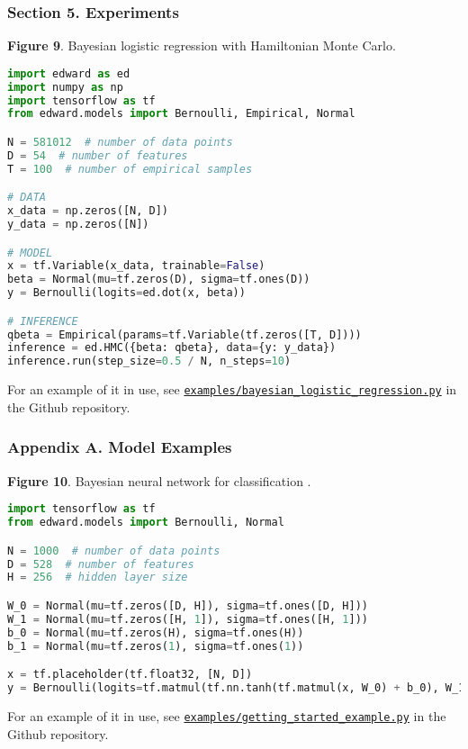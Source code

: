 \subsubsection{Section 5. Experiments}

\textbf{Figure 9}. Bayesian logistic regression with Hamiltonian Monte Carlo.
\begin{lstlisting}[language=python]
import edward as ed
import numpy as np
import tensorflow as tf
from edward.models import Bernoulli, Empirical, Normal

N = 581012  # number of data points
D = 54  # number of features
T = 100  # number of empirical samples

# DATA
x_data = np.zeros([N, D])
y_data = np.zeros([N])

# MODEL
x = tf.Variable(x_data, trainable=False)
beta = Normal(mu=tf.zeros(D), sigma=tf.ones(D))
y = Bernoulli(logits=ed.dot(x, beta))

# INFERENCE
qbeta = Empirical(params=tf.Variable(tf.zeros([T, D])))
inference = ed.HMC({beta: qbeta}, data={y: y_data})
inference.run(step_size=0.5 / N, n_steps=10)
\end{lstlisting}
For an example of it in use, see
\href{https://github.com/blei-lab/edward/blob/master/examples/bayesian_logistic_regression.py}{\texttt{examples/bayesian_logistic_regression.py}}
in the Github repository.

\subsubsection{Appendix A. Model Examples}

\textbf{Figure 10}. Bayesian neural network for classification \citep{denker1987large}.
\begin{lstlisting}[language=python]
import tensorflow as tf
from edward.models import Bernoulli, Normal

N = 1000  # number of data points
D = 528  # number of features
H = 256  # hidden layer size

W_0 = Normal(mu=tf.zeros([D, H]), sigma=tf.ones([D, H]))
W_1 = Normal(mu=tf.zeros([H, 1]), sigma=tf.ones([H, 1]))
b_0 = Normal(mu=tf.zeros(H), sigma=tf.ones(H))
b_1 = Normal(mu=tf.zeros(1), sigma=tf.ones(1))

x = tf.placeholder(tf.float32, [N, D])
y = Bernoulli(logits=tf.matmul(tf.nn.tanh(tf.matmul(x, W_0) + b_0), W_1) + b_1)
\end{lstlisting}
For an example of it in use, see
\href{https://github.com/blei-lab/edward/blob/master/examples/getting_started_example.py}{\texttt{examples/getting_started_example.py}}
in the Github repository.

